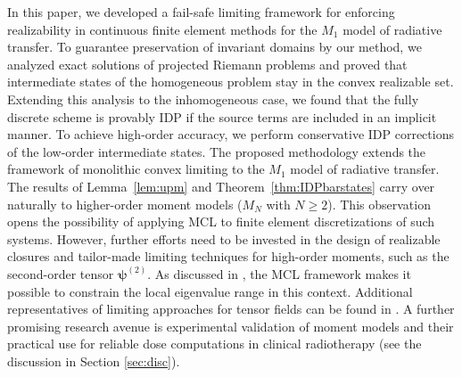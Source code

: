 \documentclass[preprint, 11pt]{elsarticle}
\newcommand{\R}{\mathbb{R}}
\newcommand{\pt}{\boldsymbol{\psi}^{(2)}}
\begin{document}
In this paper, we developed a fail-safe limiting framework for enforcing
realizability in continuous finite element methods for the $M_1$ model
of radiative transfer.
To guarantee preservation of invariant domains by our method,
we analyzed exact solutions of projected Riemann problems
and proved that intermediate states of the homogeneous problem stay in the
convex realizable set. Extending this analysis to the inhomogeneous case,
we found that the fully discrete scheme is provably IDP if the source
terms are included in an implicit manner. To achieve high-order accuracy, we
perform conservative IDP corrections of the low-order intermediate states.
The proposed methodology extends the framework of monolithic convex limiting
to the $M_1$ model of radiative transfer. The results of Lemma~\ref{lem:upm}
and Theorem~\ref{thm:IDPbarstates} carry over naturally to higher-order moment
models ($M_N$ with $N \geq 2$).  This observation opens the possibility of
applying MCL to finite element discretizations of such systems. However,
further efforts need to be invested in the design of realizable closures
and tailor-made limiting techniques for high-order moments, such as the
second-order tensor $\pt$. As discussed in \cite[Section~5.2]{kuzmin2020},
the MCL framework makes it possible
 to constrain the local eigenvalue range in this context.
Additional representatives of limiting approaches for tensor fields can be found in
\cite{lohmann2019}. A further
promising research avenue is experimental validation of moment models
and their practical use for reliable
dose computations in clinical radiotherapy (see the discussion in Section \ref{sec:disc}). 




\end{document}
